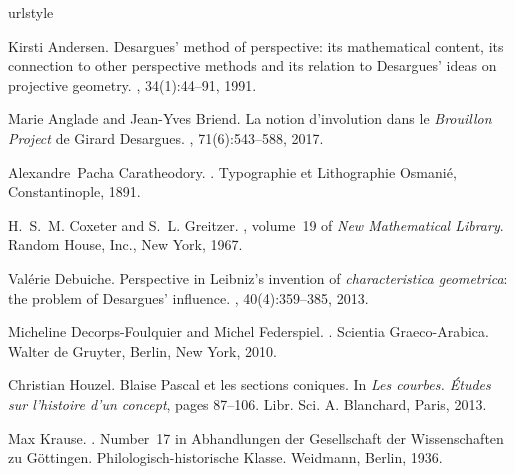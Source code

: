 \documentclass[12pt, a4paper]{article}
\begin{document}

%
\begin{thebibliography}{10}
\providecommand{\url}[1]{{#1}}
\providecommand{\urlprefix}{URL }
\expandafter\ifx\csname urlstyle\endcsname\relax
  \providecommand{\doi}[1]{DOI~\discretionary{}{}{}#1}\else
  \providecommand{\doi}{DOI~\discretionary{}{}{}\begingroup
  \urlstyle{rm}\Url}\fi

Kirsti Andersen.
\newblock Desargues' method of perspective: its mathematical content, its
  connection to other perspective methods and its relation to {D}esargues'
  ideas on projective geometry.
, 34(1):44--91, 1991.

Marie Anglade and Jean-Yves Briend.
\newblock La notion d'involution dans le \emph{{B}rouillon {P}roject} de
  {G}irard {D}esargues.
, 71(6):543--588, 2017.

{A}lexandre~{P}acha Caratheodory.
.
\newblock Typographie et {L}ithographie {O}smani{\'e}, {C}onstantinople, 1891.

H.~S.~M. Coxeter and S.~L. Greitzer.
, volume~19 of {\em New Mathematical
  Library}.
\newblock Random House, Inc., New York, 1967.

Val{\'e}rie Debuiche.
\newblock Perspective in {L}eibniz's invention of {\it {c}haracteristica
  geometrica}: the problem of {D}esargues' influence.
, 40(4):359--385, 2013.

Micheline Decorps-Foulquier and Michel Federspiel.
.
\newblock Scientia Graeco-Arabica. Walter de Gruyter, Berlin, New York, 2010.

Christian Houzel.
\newblock Blaise {P}ascal et les sections coniques.
\newblock In {\em Les courbes. {\'E}tudes sur l'histoire d'un concept}, pages
  87--106. Libr. Sci. A. Blanchard, Paris, 2013.

Max Krause.
.
\newblock Number~17 in Abhandlungen der {G}esellschaft der {W}issenschaften zu
  {G}{\"o}ttingen. {P}hilologisch-historische {K}lasse. Weidmann, {B}erlin,
  1936.


\end{thebibliography}
\end{document}
